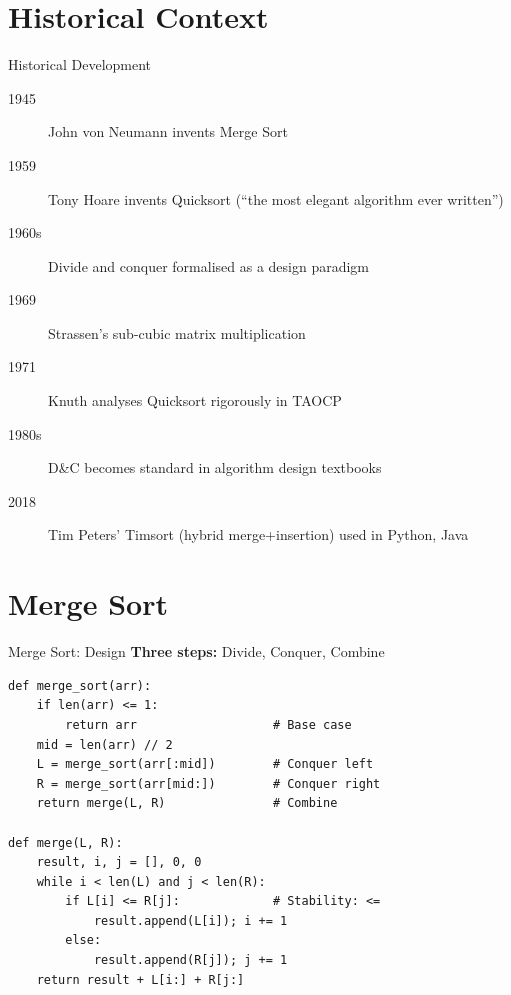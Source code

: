 \documentclass[aspectratio=169,xcolor=dvipsnames]{beamer}
\begin{document}
\section{Historical Context}
\begin{frame}{Historical Development}
  \begin{description}
    \item[1945] John von Neumann invents Merge Sort
    \item[1959] Tony Hoare invents Quicksort (``the most elegant algorithm ever written'')
    \item[1960s] Divide and conquer formalised as a design paradigm
    \item[1969] Strassen's sub-cubic matrix multiplication
    \item[1971] Knuth analyses Quicksort rigorously in TAOCP
    \item[1980s] D\&C becomes standard in algorithm design textbooks
    \item[2018] Tim Peters' Timsort (hybrid merge+insertion) used in Python, Java
  \end{description}
\end{frame}

\section{Merge Sort}
\begin{frame}[fragile]{Merge Sort: Design}
  \textbf{Three steps:} Divide, Conquer, Combine
  \begin{lstlisting}
def merge_sort(arr):
    if len(arr) <= 1:
        return arr                   # Base case
    mid = len(arr) // 2
    L = merge_sort(arr[:mid])        # Conquer left
    R = merge_sort(arr[mid:])        # Conquer right
    return merge(L, R)               # Combine

def merge(L, R):
    result, i, j = [], 0, 0
    while i < len(L) and j < len(R):
        if L[i] <= R[j]:             # Stability: <=
            result.append(L[i]); i += 1
        else:
            result.append(R[j]); j += 1
    return result + L[i:] + R[j:]
  \end{lstlisting}
\end{frame}
\end{document}
